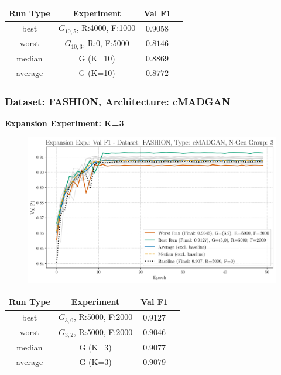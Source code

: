 \begin{table}[H]
	\vspace{-1em}
	\centering
	\begin{tabular}{|c|c|c|c|}
		\hline
		Run Type & Experiment & Val F1 \\ \hline
		best & \(G_{10, 5}\), R:4000, F:1000 & $0.9058$\\ \hline
		worst & \(G_{10, 3}\), R:0, F:5000 & $0.8146$\\ \hline
		median & G (K=10) & $0.8869$\\ \hline
		average & G (K=10) & $0.8772$
		\\ \hline
	\end{tabular}
\end{table}
\newpage
\subsubsection{Dataset: FASHION, Architecture: cMADGAN}
\noindent\textbf{Expansion Experiment: K=3}
\begin{figure}[htbp]
	\centering
	\includegraphics[width=.85\textwidth]{abb/strat_classifier_performance/FASHION_STRATIFIED_CLASSIFIERS_cMADGAN_NEW/expansion_experiments/val_f1_score_cMADGAN_FASHION_n_gen_3_all.png}
	\label{fig:app_strat_class_performance_expansion_exp._val_f1_score_3}
\end{figure}
\begin{table}[H]
	\vspace{-1em}
	\centering
	\begin{tabular}{|c|c|c|c|}
		\hline
		Run Type & Experiment & Val F1 \\ \hline
		best & \(G_{3, 0}\), R:5000, F:2000 & $0.9127$\\ \hline
		worst & \(G_{3, 2}\), R:5000, F:2000 & $0.9046$\\ \hline
		median & G (K=3) & $0.9077$\\ \hline
		average & G (K=3) & $0.9079$
		\\ \hline
	\end{tabular}
\end{table}
